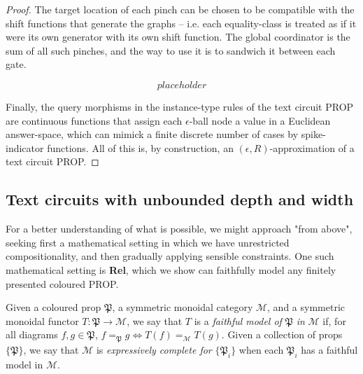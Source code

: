 \begin{theorem}
\begin{proof}
The target location of each pinch can be chosen to be compatible with the shift functions that generate the graphs -- i.e. each equality-class is treated as if it were its own generator with its own shift function. The global coordinator is the sum of all such pinches, and the way to use it is to sandwich it between each gate.

\[placeholder\]

Finally, the query morphisms in the instance-type rules of the text circuit PROP are continuous functions that assign each $\epsilon$-ball node a value in a Euclidean answer-space, which can mimick a finite discrete number of cases by spike-indicator functions. All of this is, by construction, an $(\epsilon,R)$-approximation of a text circuit PROP.
\end{proof}
\end{theorem}

\subsection{Text circuits with unbounded depth and width}

For a better understanding of what is possible, we might approach "from above", seeking first a mathematical setting in which we have unrestricted compositionality, and then gradually applying sensible constraints. One such mathematical setting is \textbf{Rel}, which we show can faithfully model any finitely presented coloured PROP.

\begin{defn}
Given a coloured prop $\mathfrak{P}$, a symmetric monoidal category $\mathcal{M}$, and a symmetric monoidal functor $T: \mathfrak{P} \rightarrow \mathcal{M}$, we say that $T$ is a \emph{faithful model of} $\mathfrak{P}$ \emph{in} $\mathcal{M}$ if, for all diagrams $f,g \in \mathfrak{P}$, $f =_\mathfrak{P} g \iff T(f) =_\mathcal{M} T(g)$. Given a collection of props $\{\mathfrak{P}\}$, we say that $\mathcal{M}$ is \emph{expressively complete for} $\{\mathfrak{P}_i\}$ when each $\mathfrak{P}_i$ has a faithful model in $\mathcal{M}$.
\end{defn}

